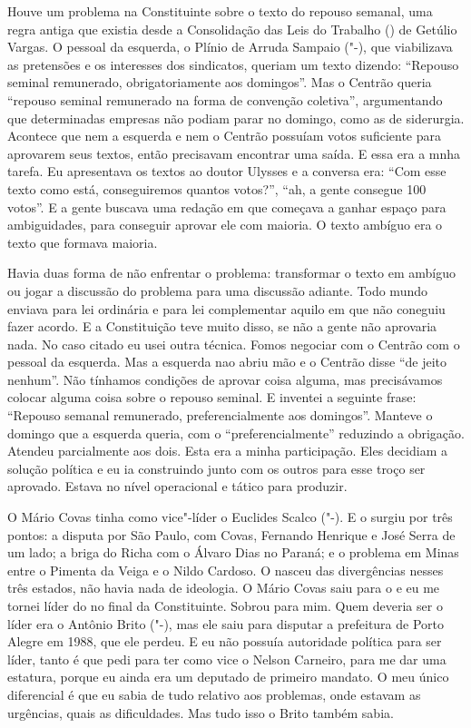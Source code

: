 Houve um problema na Constituinte sobre o texto do repouso semanal, uma
regra antiga que existia desde a Consolidação das Leis do Trabalho ()
de Getúlio Vargas. O pessoal da esquerda, o Plínio de Arruda Sampaio
("-), que viabilizava as pretensões e os interesses dos sindicatos,
queriam um texto dizendo: ``Repouso seminal remunerado, obrigatoriamente
aos domingos''. Mas o Centrão queria ``repouso seminal remunerado na
forma de convenção coletiva'', argumentando que determinadas empresas
não podiam parar no domingo, como as de siderurgia. Acontece que nem a
esquerda e nem o Centrão possuíam votos suficiente para aprovarem seus
textos, então precisavam encontrar uma saída. E essa era a mnha tarefa.
Eu apresentava os textos ao doutor Ulysses e a conversa era: ``Com esse
texto como está, conseguiremos quantos votos?'', ``ah, a gente consegue
100 votos''. E a gente buscava uma redação em que começava a ganhar
espaço para ambiguidades, para conseguir aprovar ele com maioria. O
texto ambíguo era o texto que formava maioria.

Havia duas forma de não enfrentar o problema: transformar o texto em
ambíguo ou jogar a discussão do problema para uma discussão adiante.
Todo mundo enviava para lei ordinária e para lei complementar aquilo em
que não coneguiu fazer acordo. E a Constituição teve muito disso, se não
a gente não aprovaria nada. No caso citado eu usei outra técnica. Fomos
negociar com o Centrão com o pessoal da esquerda. Mas a esquerda nao
abriu mão e o Centrão disse ``de jeito nenhum''. Não tínhamos condições
de aprovar coisa alguma, mas precisávamos colocar alguma coisa sobre o
repouso seminal. E inventei a seguinte frase: ``Repouso semanal
remunerado, preferencialmente aos domingos''. Manteve o domingo que a
esquerda queria, com o ``preferencialmente'' reduzindo a obrigação.
Atendeu parcialmente aos dois. Esta era a minha participação. Eles
decidiam a solução política e eu ia construindo junto com os outros para
esse troço ser aprovado. Estava no nível operacional e tático para
produzir.

O Mário Covas tinha como vice"-líder o Euclides Scalco ("-). E o
 surgiu por três pontos: a disputa por São Paulo, com Covas,
Fernando Henrique e José Serra de um lado; a briga do Richa com o Álvaro
Dias no Paraná; e o problema em Minas entre o Pimenta da Veiga e o Nildo
Cardoso. O  nasceu das divergências nesses três estados, não havia
nada de ideologia. O Mário Covas saiu para o  e eu me tornei líder
do  no final da Constituinte. Sobrou para mim. Quem deveria ser o
líder era o Antônio Brito ("-), mas ele saiu para disputar a
prefeitura de Porto Alegre em 1988, que ele perdeu. E eu não possuía
autoridade política para ser líder, tanto é que pedi para ter como vice o
Nelson Carneiro, para me dar uma estatura, porque eu ainda era um
deputado de primeiro mandato. O meu único diferencial é que eu sabia de
tudo relativo aos problemas, onde estavam as urgências, quais as
dificuldades. Mas tudo isso o Brito também sabia.

